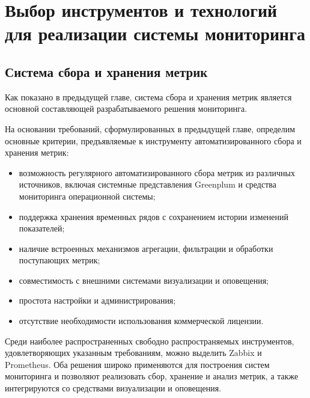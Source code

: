 \chapter{Выбор инструментов и технологий для реализации системы мониторинга} \label{ch2}
	

\section{Система сбора и хранения метрик} \label{ch2:sec1}

Как показано в предыдущей главе, система сбора и хранения метрик является основной составляющей разрабатываемого решения мониторинга. 

На основании требований, сформулированных в предыдущей главе, определим основные критерии, предъявляемые к инструменту автоматизированного сбора и хранения метрик:

\begin{itemize}
	\item возможность регулярного автоматизированного сбора метрик из различных источников, включая системные представления Greenplum и средства мониторинга операционной системы;
	
	\item поддержка хранения временных рядов с сохранением истории изменений показателей;
	
	\item наличие встроенных механизмов агрегации, фильтрации и обработки поступающих метрик;
	
	\item совместимость с внешними системами визуализации и оповещения;
	
	\item простота настройки и администрирования;
	
	\item отсутствие необходимости использования коммерческой лицензии.
\end{itemize}

Среди наиболее распространенных свободно распространяемых инструментов, удовлетворяющих указанным требованиям, можно выделить Zabbix и Prometheus. Оба решения широко применяются для построения систем мониторинга и позволяют реализовать сбор, хранение и анализ метрик, а также интегрируются со средствами визуализации и оповещения.

